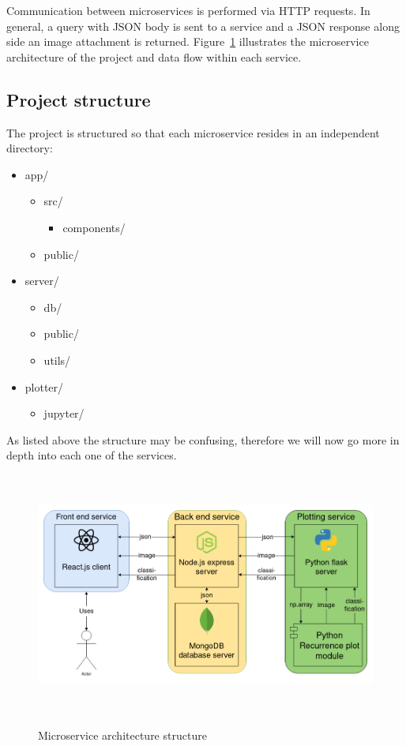 \documentclass[a4paper,12pt,fleqn]{article}
\begin{document}
Communication between microservices is performed via HTTP requests. In general, a query with JSON body is sent to a service and a JSON response along side an image attachment is returned.
Figure~\ref{fig:architecture_diagram} illustrates the microservice architecture of the project and data flow within each service.

\subsection{Project structure}
The project is structured so that each microservice resides in an independent directory:
\begin{itemize}
  \item app/
  \begin{itemize}
    \item src/
    \begin{itemize}
      \item components/
    \end{itemize}
    \item public/
  \end{itemize}
  \item server/
  \begin{itemize}
    \item db/
    \item public/
    \item utils/
  \end{itemize}
  \item plotter/
  \begin{itemize}
    \item jupyter/
  \end{itemize} 
\end{itemize}
As listed above the structure may be confusing, therefore we will now go more in depth into each one of the services.
\begin{figure}[h]
  \centering
  {\includegraphics[height=8cm]{assets/architecture_diagram.png}}
  \caption{Microservice architecture structure}
  \label{fig:architecture_diagram}
\end{figure}
\end{document}
